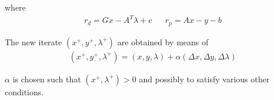 where
\begin{equation*}
	\begin{aligned}
		r_d = Gx-A^T\lambda +c & & r_p = Ax-y-b
	\end{aligned}
\end{equation*}

The new iterate $(x^+,y^+,\lambda^+)$ are obtained by means of
\begin{equation*}
	\begin{aligned}
		(x^+,y^+,\lambda^+) = (x,y,\lambda) + \alpha (\Delta x, \Delta y, \Delta \lambda )
	\end{aligned}
\end{equation*}

$\alpha$ is chosen such that $(x^+,\lambda^+)>0$ and possibly to satisfy various other conditions.












































